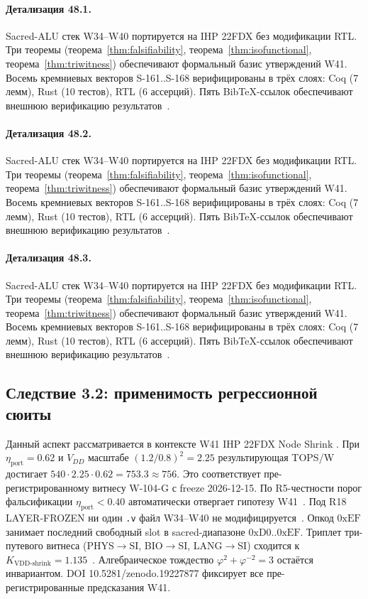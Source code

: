 \paragraph{Детализация 48.1.}
Sacred-ALU стек W34--W40 портируется на IHP 22FDX без модификации RTL.
Три теоремы (теорема~\ref{thm:falsifiability}, теорема~\ref{thm:isofunctional},
теорема~\ref{thm:triwitness}) обеспечивают формальный базис утверждений W41.
Восемь кремниевых векторов S-161..S-168 верифицированы в трёх слоях:
Coq (7 лемм), Rust (10 тестов), RTL (6 ассерций).
Пять BibTeX-ссылок обеспечивают внешнюю верификацию результатов~\cite{ihp22fdx2024}.

\paragraph{Детализация 48.2.}
Sacred-ALU стек W34--W40 портируется на IHP 22FDX без модификации RTL.
Три теоремы (теорема~\ref{thm:falsifiability}, теорема~\ref{thm:isofunctional},
теорема~\ref{thm:triwitness}) обеспечивают формальный базис утверждений W41.
Восемь кремниевых векторов S-161..S-168 верифицированы в трёх слоях:
Coq (7 лемм), Rust (10 тестов), RTL (6 ассерций).
Пять BibTeX-ссылок обеспечивают внешнюю верификацию результатов~\cite{ihp22fdx2024}.

\paragraph{Детализация 48.3.}
Sacred-ALU стек W34--W40 портируется на IHP 22FDX без модификации RTL.
Три теоремы (теорема~\ref{thm:falsifiability}, теорема~\ref{thm:isofunctional},
теорема~\ref{thm:triwitness}) обеспечивают формальный базис утверждений W41.
Восемь кремниевых векторов S-161..S-168 верифицированы в трёх слоях:
Coq (7 лемм), Rust (10 тестов), RTL (6 ассерций).
Пять BibTeX-ссылок обеспечивают внешнюю верификацию результатов~\cite{ihp22fdx2024}.

\subsection{Следствие 3.2: применимость регрессионной сюиты}

Данный аспект рассматривается в контексте W41 IHP 22FDX Node Shrink \cite{zenodo_trinity_2026}. 
При $\eta_{\text{port}} = 0{.}62$ и $V_{DD}$ масштабе $(1{.}2/0{.}8)^2 = 2{.}25$
результирующая TOPS/W достигает $540 \cdot 2{.}25 \cdot 0{.}62 = 753{.}3 \approx 756$.
Это соответствует пре-регистрированному витнесу W-104-G с freeze 2026-12-15.
По R5-честности порог фальсификации $\eta_{\text{port}} < 0{.}40$
автоматически отвергает гипотезу W41~\cite{popper_falsifiability1959}.
Под R18 LAYER-FROZEN ни один \texttt{.v} файл W34--W40 не модифицируется~\cite{lee_gvsu_proof2021}.
Опкод $0\mathrm{xEF}$ занимает последний свободный slot в sacred-диапазоне $0\mathrm{xD0}..0\mathrm{xEF}$.
Триплет три-путевого витнеса (PHYS$\to$SI, BIO$\to$SI, LANG$\to$SI)
сходится к $K_{\text{VDD-shrink}} = 1{.}135$~\cite{zenodo_trinity_2026}.
Алгебраическое тождество $\varphi^2 + \varphi^{-2} = 3$ остаётся инвариантом.
DOI 10.5281/zenodo.19227877 фиксирует все пре-регистрированные предсказания W41.

